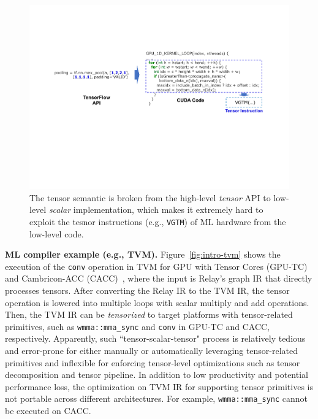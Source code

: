 \begin{figure}[t]
  \centering
\includegraphics[width=1.0\columnwidth]{figures/intro-tf.pdf}
\vspace{-15pt}
\caption{\footnotesize The tensor semantic is broken from the high-level \emph{tensor} API to low-level \emph{scalar} implementation, which makes it extremely hard to exploit the tesnor instructions (e.g., \texttt{VGTM}) of ML hardware from the low-level code.}
\label{fig:intro-tf}
\vspace{-15pt}
\end{figure}

\textbf{ML compiler example (e.g., TVM).} Figure~\ref{fig:intro-tvm} shows the execution of the \texttt{conv} operation in TVM for GPU with Tensor Cores (GPU-TC) and Cambricon-ACC (CACC)~\cite{chen2019instruction}, where the input is Relay's graph IR that directly processes tensors. After converting the Relay IR to the TVM IR, the tensor operation is lowered into multiple loops with scalar multiply and add operations. Then, the TVM IR can be \emph{tensorized} to target platforms with tensor-related primitives, such as \texttt{wmma::mma\_sync} and \texttt{conv} in GPU-TC and CACC, respectively. Apparently, such ``tensor-scalar-tensor" process is relatively tedious and error-prone for either manually or automatically leveraging tensor-related primitives and inflexible for enforcing tensor-level optimizations such as tensor decomposition and tensor pipeline. In addition to low productivity and potential performance loss, the optimization on TVM IR for supporting tensor primitives is not portable across different architectures. For example, \texttt{wmma::mma\_sync} cannot be executed on CACC. %

